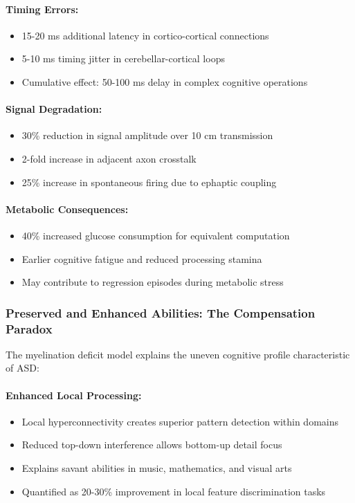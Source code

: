 \documentclass[11pt]{article}
\let\oldsubsubsection\subsubsection
\renewcommand{\subsubsection}[1]{\oldsubsubsection{#1}\setlength{\leftskip}{1.5em}}
\begin{document}
\paragraph{Timing Errors:}
\begin{itemize}
\item 15-20 ms additional latency in cortico-cortical connections
\item 5-10 ms timing jitter in cerebellar-cortical loops
\item Cumulative effect: 50-100 ms delay in complex cognitive operations
\end{itemize}

\paragraph{Signal Degradation:}
\begin{itemize}
\item 30\% reduction in signal amplitude over 10 cm transmission
\item 2-fold increase in adjacent axon crosstalk
\item 25\% increase in spontaneous firing due to ephaptic coupling
\end{itemize}

\paragraph{Metabolic Consequences:}
\begin{itemize}
\item 40\% increased glucose consumption for equivalent computation
\item Earlier cognitive fatigue and reduced processing stamina
\item May contribute to regression episodes during metabolic stress
\end{itemize}

\subsubsection{Preserved and Enhanced Abilities: The Compensation Paradox}

The myelination deficit model explains the uneven cognitive profile characteristic of ASD:

\paragraph{Enhanced Local Processing:}
\begin{itemize}
\item Local hyperconnectivity creates superior pattern detection within domains
\item Reduced top-down interference allows bottom-up detail focus
\item Explains savant abilities in music, mathematics, and visual arts
\item Quantified as 20-30\% improvement in local feature discrimination tasks
\end{itemize}
\end{document}
